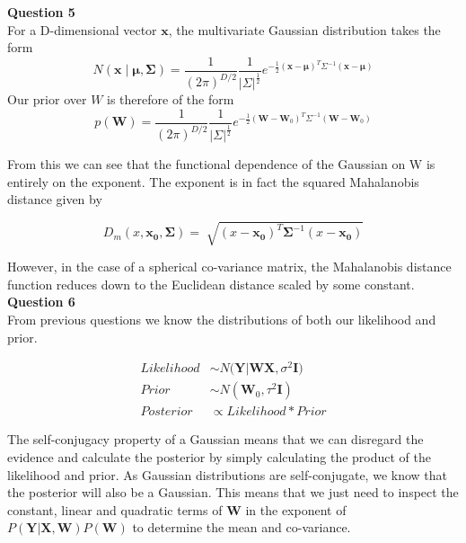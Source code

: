 \documentclass[10pt, a4paper, twocolumn]{article} %
\begin{document}
\begin{enumerate}
  \textbf{Question 5}\\
  For a D-dimensional vector $\mathbf{x}$, the multivariate Gaussian distribution takes the form
  \begin{equation}
  N(\mathbf{x}\mid\mathbf{\mu}, \mathbf{\Sigma}) =  \frac{1}{{{(2\pi) }^{D/2} }}\frac{1}{|\Sigma|^{\frac{1}{2}}}e^{-\frac{1}{2}(\mathbf{x} - \mathbf{\mu})^{T}\Sigma ^{-1}(\mathbf{x} - \mathbf{\mu})}
  \end{equation}
  Our prior over $W$ is therefore of the form 
  \begin{equation}
  p(\mathbf{W}) = \frac{1}{{{(2\pi) }^{D/2} }}\frac{1}{|\Sigma|^{\frac{1}{2}}}e^{-\frac{1}{2}(\mathbf{W} - \mathbf{W}_{0})^{T}\Sigma ^{-1}(\mathbf{W} - \mathbf{W}_{0})}
  \end{equation}
  
  From this we can see that the functional dependence of the Gaussian on W is entirely on the exponent. The exponent is in fact the squared Mahalanobis distance given by
  
  \begin{equation}
      D_m(x,\mathbf{x_0},\mathbf{\Sigma}) = \sqrt[]{(x-\mathbf{x_0})^T \mathbf{\Sigma}^{-1} (x-\mathbf{x_0})}
  \end{equation}
  
  However, in the case of a spherical co-variance matrix, the Mahalanobis distance function reduces down to the Euclidean distance scaled by some constant.\\
  
  \textbf{Question 6}\\ 
  From previous questions we know the distributions of both our likelihood and prior.
  
  \begin{align}
    Likelihood &\sim N(\mathbf{Y}|\mathbf{W}\mathbf{X}, \sigma^2\mathbf{I)}\\
    Prior &\sim N(\mathbf{W}_{0}, \tau^2\mathbf{I})\\
    Posterior &\propto Likelihood * Prior
  \end{align}
  

  The self-conjugacy property of a Gaussian means that we can disregard the evidence and calculate the posterior by simply calculating the product of the likelihood and prior. As Gaussian distributions are self-conjugate, we know that the posterior will also be a Gaussian. This means that we just need to inspect the constant, linear and quadratic terms of $\mathbf{W}$ in the exponent of $P(\mathbf{Y}|\mathbf{X},\mathbf{W})P(\mathbf{W})$ to determine the mean and co-variance.
  

\end{enumerate}
\end{document}
